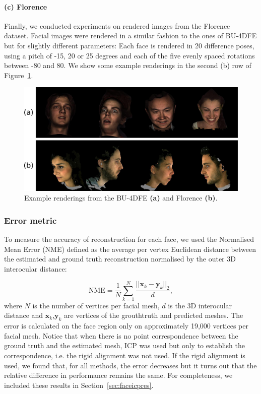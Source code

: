 \paragraph{(c) Florence}
Finally, we conducted experiments on rendered images from the
Florence~\cite{masi2d3dFaceData} dataset. Facial images were rendered
in a similar fashion to the ones of BU-4DFE but for slightly different
parameters: Each face is rendered in 20 difference poses, using a
pitch of -15, 20 or 25 degrees and each of the five evenly spaced
rotations between -80 and 80. We show some example renderings in the
second (b) row of Figure~\ref{fig:example_renderings}.

\begin{figure}
  \centering
  \includegraphics[width=0.9\linewidth]{img/rendering_examples.pdf}
  \caption[Example BU-4DFE and Florence renderings]{Example renderings
    from the BU-4DFE \textbf{(a)} and Florence \textbf{(b)}.}
  \label{fig:example_renderings}
\end{figure}

\subsubsection{Error metric} To measure the accuracy of reconstruction for
each face, we used the Normalised Mean Error (NME) defined as the
average per vertex Euclidean distance between the estimated and ground
truth reconstruction normalised by the outer 3D interocular distance:

\begin{equation}
  \textrm{NME} = \frac{1}{N} \sum_{k=1}^{N} \frac{||\mathbf{x}_k-\mathbf{y}_{k} ||_{2} }{d}, \label{eq:err}
\end{equation}
where $N$ is the number of vertices per facial mesh, $d$ is the 3D
interocular distance and $\mathbf{x}_k$,$\mathbf{y}_k$ are vertices of
the grouthtruth and predicted meshes. The error is calculated on the
face region only on approximately 19,000 vertices per facial
mesh. Notice that when there is no point correspondence between the
ground truth and the estimated mesh, ICP was used but only to
establish the correspondence, i.e. the rigid alignment was not
used. If the rigid alignment is used, we found that, for all methods,
the error decreases but it turns out that the relative difference in
performance remains the same. For completeness, we included these
results in Section~\ref{sec:faceicpres}.

